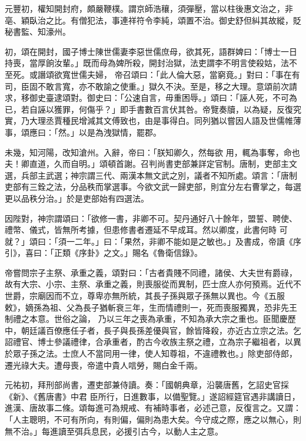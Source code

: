 \begin{pinyinscope}
 元豐初，權知開封府，頗嚴鞭樸。謂京師浩穰，須彈壓，當以柱後惠文治之，非亳、穎臥治之比。有僧犯法，事連祥符令李純，頌置不治。御史舒但糾其故縱，貶秘書監、知濠州。



 初，頌在開封，國子博士陳世儒妻李惡世儒庶母，欲其死，語群婢曰：「博士一日持喪，當厚餉汝輩。」既而母為婢所殺，開封治獄，法吏謂李不明言使殺姑，法不至死。或譖頌欲寬世儒夫婦，
 帝召頌曰：「此人倫大惡，當窮竟。」對曰：「事在有司，臣固不敢言寬，亦不敢諭之使重。」獄久不決。至是，移之大理。意頌前次請求，移御史臺逮頌對。御史曰：「公速自言，毋重困辱。」頌曰：「誣人死，不可為已，若自誣以獲罪，何傷乎？」即手書數百言伏其咎。帝覽奏牘，以為疑，反復究實，乃大理丞賈種民增減其文傅致也，由是事得白。同列猶以嘗因人語及世儒帷薄事，頌應曰：「然。」以是為洩獄情，罷郡。



 未幾，知河陽，改知滄州。入辭，帝曰：「朕知卿久，然每欲
 用，輒為事奪，命也夫！卿直道，久而自明。」頌頓首謝。召判尚書吏部兼詳定官制。唐制，吏部主文選，兵部主武選；神宗謂三代、兩漢本無文武之別，議者不知所處。頌言：「唐制吏部有三銓之法，分品秩而掌選事。今欲文武一歸吏部，則宜分左右曹掌之，每選更以品秩分治。」於是吏部始有四選法。



 因陛對，神宗謂頌曰：「欲修一書，非卿不可。契丹通好八十餘年，盟誓、聘使、禮幣、儀式，皆無所考據，但患修書者遷延不早成耳。然以卿度，此書何時
 可就？」頌曰：「須一二年。」曰：「果然，非卿不能如是之敏也。」及書成，帝讀《序引》，喜曰：「正類《序卦》之文。」賜名《魯衛信錄》。



 帝嘗問宗子主祭、承重之義，頌對曰：「古者貴賤不同禮，諸侯、大夫世有爵祿，故有大宗、小宗、主祭、承重之義，則喪服從而異制，匹士庶人亦何預焉。近代不世爵，宗廟因而不立，尊卑亦無所統，其長子孫與眾子孫無以異也。今《五服敕》，嫡孫為祖、父為長子猶斬衰三年，生而情禮則一，死而喪服獨異，恐非先王制禮之本意。世俗之論，
 乃以三年之喪為承重，不知為承大宗之重也。臣聞慶歷中，朝廷議百僚應任子者，長子與長孫差優與官，餘皆降殺，亦近古立宗之法。乞詔禮官、博士參議禮律，合承重者，酌古今收族主祭之禮，立為宗子繼祖者，以異於眾子孫之法。士庶人不當同用一律，使人知尊祖，不違禮教也。」除吏部侍郎，遷光祿大夫。遭母喪，帝遣中貴人唁勞，賜白金千兩。



 元祐初，拜刑部尚書，遷吏部兼侍讀。奏：「國朝典章，沿襲唐舊，乞詔史官採《新》、《舊唐書》中君
 臣所行，日進數事，以備聖覽。」遂詔經筵官遇非講讀日，進漢、唐故事二條。頌每進可為規戒、有補時事者，必述己意，反復言之。又謂：「人主聰明，不可有所向，有則偏，偏則為患大矣。今守成之際，應之以無心，則無不治。」每進讀至弭兵息民，必援引古今，以動人主之意。




\end{pinyinscope}

